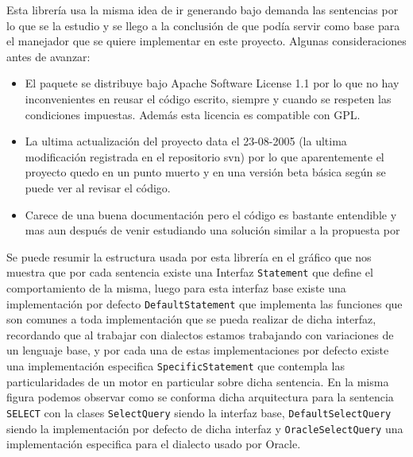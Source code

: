 Esta librería  usa la misma idea de ir generando bajo demanda las sentencias por lo que se la estudio y se llego a la conclusión de que podía servir como base para el manejador que se quiere implementar en este proyecto. Algunas consideraciones antes de avanzar:
%
\begin{itemize}
\item El paquete se distribuye bajo Apache Software License 1.1 por lo que no hay inconvenientes en reusar el código escrito, siempre y cuando se respeten las condiciones impuestas. Además esta licencia es compatible con GPL.
\item La ultima actualización del proyecto data el 23-08-2005 (la ultima modificación registrada en el repositorio svn) por lo que aparentemente el proyecto quedo en un punto muerto y en una versión beta básica según se puede ver al revisar el código.
\item Carece de una buena documentación pero el código es bastante entendible y mas aun después de venir estudiando una solución similar a la propuesta por \cc
\end{itemize}
%
Se puede resumir la estructura usada por esta librería en el gráfico  que nos muestra que por cada sentencia existe una Interfaz \verb=Statement= que define el comportamiento de la misma, luego para esta interfaz base existe una implementación por defecto \verb=DefaultStatement= que implementa las funciones que son comunes a toda implementación que se pueda realizar de dicha interfaz, recordando que al trabajar con dialectos estamos trabajando con variaciones de un lenguaje base, y por cada una de estas implementaciones por defecto existe una implementación especifica \verb=SpecificStatement= que contempla las particularidades de un motor en particular sobre dicha sentencia. En la misma figura podemos observar como se conforma dicha arquitectura para la sentencia \verb=SELECT= con la clases \verb=SelectQuery= siendo la interfaz base, \verb=DefaultSelectQuery= siendo la implementación por defecto de dicha interfaz y \verb=OracleSelectQuery= una implementación especifica para el dialecto usado por Oracle.
%
%
